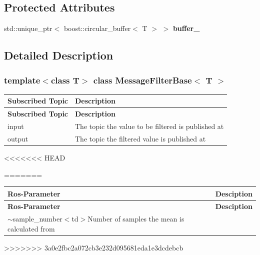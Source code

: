 \subsection*{Protected Attributes}
\begin{DoxyCompactItemize}
\item 
\mbox{\label{classMessageFilterBase_a0b7db0e443e75ce02ef154f233adc97d}} 
std\+::unique\+\_\+ptr$<$ boost\+::circular\+\_\+buffer$<$ T $>$ $>$ {\bfseries buffer\+\_\+}
\end{DoxyCompactItemize}


\subsection{Detailed Description}
\subsubsection*{template$<$class T$>$\newline
class Message\+Filter\+Base$<$ T $>$}

\tabulinesep=1mm
\begin{longtabu} spread 0pt [c]{*{2}{|X[-1]}|}
\hline
\rowcolor{\tableheadbgcolor}\textbf{ Subscribed Topic}&\textbf{ Description  }\\
\endfirsthead
\hline
\endfoot
\hline
\rowcolor{\tableheadbgcolor}\textbf{ Subscribed Topic}&\textbf{ Description  }\\
\endhead
input&The topic the value to be filtered is published at \\
output&The topic the filtered value is published at \\
\end{longtabu}
<<<<<<< HEAD


=======
\tabulinesep=1mm
\begin{longtabu} spread 0pt [c]{*{2}{|X[-1]}|}
\hline
\rowcolor{\tableheadbgcolor}\textbf{ Ros-\/\+Parameter}&\textbf{ Desciption  }\\
\endfirsthead
\hline
\endfoot
\hline
\rowcolor{\tableheadbgcolor}\textbf{ Ros-\/\+Parameter}&\textbf{ Desciption  }\\
\endhead
$\sim$sample\+\_\+number$<$td$>$Number of samples the mean is calculated from \\
\end{longtabu}
>>>>>>> 3a0e2fbc2a072cb3e232d095681eda1e3dcdebcb

